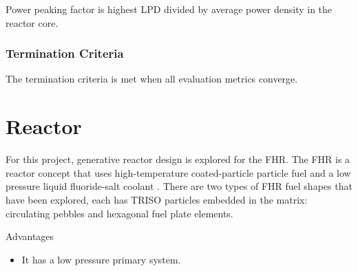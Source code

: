 Power peaking factor is highest \gls{LPD} divided by average power density in 
the reactor core. 

\subsubsection{Termination Criteria}
The termination criteria is met when all evaluation metrics converge. 

\section{Reactor}
For this project, generative reactor design is explored for the 
\gls{FHR}. 
The \gls{FHR} is a reactor concept that uses high-temperature 
coated-particle particle fuel and a low pressure liquid fluoride-salt coolant 
\cite{forsberg_fluoride-salt-cooled_2012,facilitators_fluoride-salt-cooled_2013}.  
There are two types of \gls{FHR} fuel shapes that have been explored, 
each has \gls{TRISO} particles embedded in the matrix: circulating pebbles and 
hexagonal fuel plate elements.  

Advantages 
\begin{itemize}
    \item It has a low pressure primary system. 
\end{itemize}

